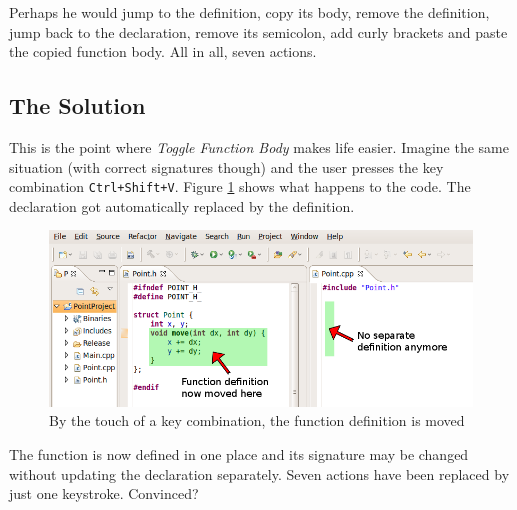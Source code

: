 Perhaps he would jump to the definition, copy its body, remove the definition, 
jump back to the declaration, remove its semicolon, add curly brackets and paste 
the copied function body. All in all, seven actions.

\subsection{The Solution}
This is the point where \textit{Toggle Function Body} makes life easier. Imagine 
the same situation (with correct signatures though) and the user presses the key 
combination \texttt{Ctrl+Shift+V}. Figure \ref{coolResult} shows what happens
to 
the code. The declaration got automatically replaced by the definition.

\begin{figure}[h]
\centering
\includegraphics[width=\textwidth]{images/resulting_function.png}
\caption{By the touch of a key combination, the function definition is moved}
\label{coolResult}
\end{figure}

The function is now defined in one place and its signature may be changed 
without updating the declaration separately. Seven actions have been replaced by 
just one keystroke. Convinced?

